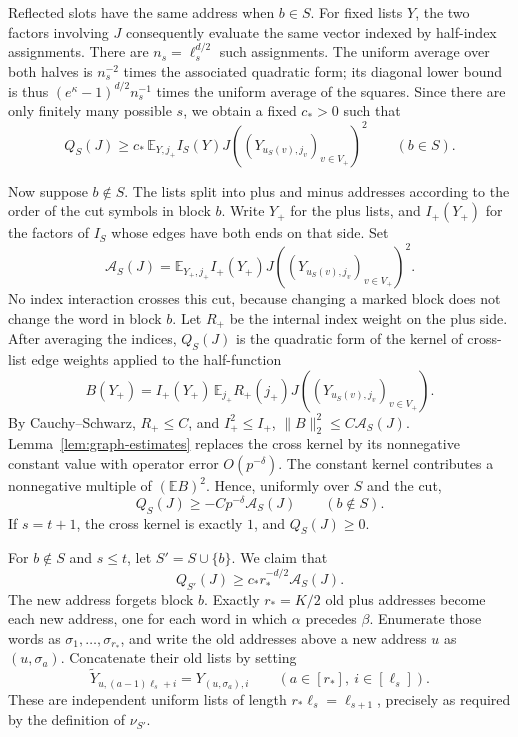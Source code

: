 Reflected slots have the same address when $b\in S$.  For fixed lists
$Y$, the two factors involving $J$ consequently evaluate the same vector
indexed by half-index assignments.  There are
$n_s=\ell_s^{d/2}$ such assignments.  The uniform average over both
halves is $n_s^{-2}$ times the associated quadratic form; its diagonal
lower bound is thus $(e^\kappa-1)^{d/2}n_s^{-1}$ times the uniform
average of the squares.  Since there are only finitely many possible
$s$, we obtain a fixed $c_*>0$ such that
\begin{equation}\label{eq:tuple-marked-positive}
 Q_S(J)\ge c_*\,
 \mathbb E_{Y,j_+}I_S(Y)
    J((Y_{u_S(v),j_v})_{v\in V_+})^2\qquad(b\in S).
\end{equation}

Now suppose $b\notin S$.  The lists split into plus and minus addresses
according to the order of the cut symbols in block $b$.  Write $Y_+$
for the plus lists, and $I_+(Y_+)$ for the factors of $I_S$ whose edges
have both ends on that side.  Set
\[
 \mathcal A_S(J)=\mathbb E_{Y_+,j_+} I_+(Y_+)
       J((Y_{u_S(v),j_v})_{v\in V_+})^2.
\]
No index interaction crosses this cut, because changing a marked block
does not change the word in block $b$.  Let $R_+$ be the internal index
weight on the plus side.  After averaging the indices, $Q_S(J)$ is the
quadratic form of the kernel of cross-list edge weights applied to the
half-function
\[
 B(Y_+)=I_+(Y_+)\,
   \mathbb E_{j_+}R_+(j_+)J((Y_{u_S(v),j_v})_{v\in V_+}).
\]
By Cauchy--Schwarz, $R_+\le C$, and $I_+^2\le I_+$,
$\|B\|_2^2\le C\mathcal A_S(J)$.
Lemma~\ref{lem:graph-estimates} replaces the cross kernel by its
nonnegative constant value with operator error $O(p^{-\delta})$.
The constant kernel contributes a nonnegative multiple of
$(\mathbb E B)^2$.  Hence, uniformly over $S$ and the cut,
\begin{equation}\label{eq:tuple-unmarked-error}
 Q_S(J)\ge-Cp^{-\delta}\mathcal A_S(J)\qquad(b\notin S).
\end{equation}
If $s=t+1$, the cross kernel is exactly $1$, and $Q_S(J)\ge0$.

For $b\notin S$ and $s\le t$, let $S'=S\cup\{b\}$.  We claim that
\begin{equation}\label{eq:tuple-concatenation}
 Q_{S'}(J)\ge c_*r_*^{-d/2}\mathcal A_S(J).
\end{equation}
The new address forgets block $b$.  Exactly $r_*=K/2$ old plus
addresses become each new address, one for each word in which $\alpha$
precedes $\beta$.  Enumerate those words as $\sigma_1,\ldots,\sigma_{r_*}$,
and write the old addresses above a new address $u$ as $(u,\sigma_a)$.
Concatenate their old lists by setting
\[
 \widetilde Y_{u,(a-1)\ell_s+i}=Y_{(u,\sigma_a),i}
 \qquad(a\in[r_*],\ i\in[\ell_s]).
\]
These are independent uniform lists of length
$r_*\ell_s=\ell_{s+1}$, precisely as required by the definition of
$\nu_{S'}$.

